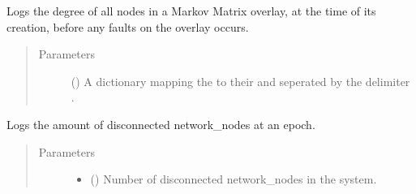 \documentclass[letterpaper,10pt,english]{sphinxmanual}
\begin{document}
\begin{fulllineitems}
\begin{fulllineitems}
\label{\detokenize{app.domain.helpers:app.domain.helpers.smart_dataclasses.LoggingData.log_matrices_degrees}}
Logs the degree of all nodes in a Markov Matrix overlay, at the
time of its creation, before any faults on the overlay occurs.
\begin{quote}\begin{description}
\item[{Parameters}] \leavevmode
{} (\sphinxstyleliteralemphasis{\sphinxupquote{{[}}}\sphinxstyleliteralemphasis{\sphinxupquote{, }}\sphinxstyleliteralemphasis{\sphinxupquote{{]}}}) \textendash{} A dictionary mapping the {\hyperref[\detokenize{app.domain:app.domain.network_nodes.Node.id}]{}} to their 
and  seperated by the delimiter .

\end{description}\end{quote}

\end{fulllineitems}


\begin{fulllineitems}
\label{\detokenize{app.domain.helpers:app.domain.helpers.smart_dataclasses.LoggingData.log_off_nodes}}
Logs the amount of disconnected network\_nodes at an epoch.
\begin{quote}\begin{description}
\item[{Parameters}] \leavevmode\begin{itemize}
\item {} 
 () \textendash{} Number of disconnected network\_nodes in the system.


\end{itemize}
\end{description}
\end{quote}
\end{fulllineitems}
\end{fulllineitems}
\end{document}

